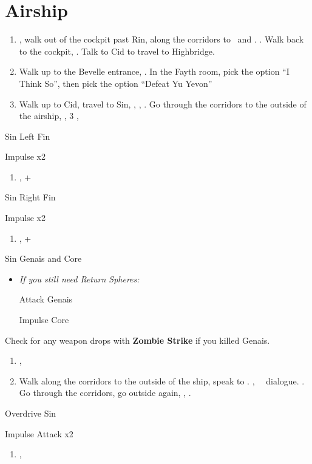 \chapter{Airship}
\begin{enumerate}
	\item \sd, walk out of the cockpit past Rin, along the corridors to \yuna\ and \kimahri. \sd. Walk back to the cockpit, \sd. Talk to Cid to travel to Highbridge.
	\item Walk up to the Bevelle entrance, \sd. In the Fayth room, pick the  option ``I Think So'', then pick the  option ``Defeat Yu Yevon''
	\item Walk up to Cid, travel to Sin, \sd, \skippablefmv, \sd. Go through the corridors to the outside of the airship, \sd, 3 \skippablefmv[2:10], \sd
\end{enumerate}
\begin{battle}[65000]{Sin Left Fin}
	\begin{itemize}
		\summon{\bahamut}
		\bahamutf Impulse x2
	\end{itemize}
\end{battle}
\begin{enumerate}[resume]
	\item \sd, \cs+\skippablefmv
\end{enumerate}
\begin{battle}[65000]{Sin Right Fin}
	\begin{itemize}
		\summon{\bahamut}
		\bahamutf Impulse x2
	\end{itemize}
\end{battle}
\begin{enumerate}[resume]
	\item \sd, \cs+\skippablefmv
\end{enumerate}
\begin{battle}[56000]{Sin Genais and Core}
	\begin{itemize}
		\summon{\bahamut}
		\item \textit{If you still need Return Spheres:}
			\begin{itemize}
				\bahamutf Attack Genais
			\end{itemize}
		\bahamutf Impulse Core
	\end{itemize}
	Check for any weapon drops with \textbf{Zombie Strike} if you killed Genais.
\end{battle}
\begin{enumerate}[resume]
	\item \sd, \skippablefmv
	\item Walk along the corridors to the outside of the ship, speak to \yuna. \cs[1:40], \sd\ \rikku\ dialogue. \skippablefmv. Go through the corridors, go outside again, \skippablefmv, \sd.
\end{enumerate}
\begin{battle}[140000]{Overdrive Sin}
	\begin{itemize}
		\summon{\bahamut}
		\bahamutf Impulse
		\bahamutf Attack x2
	\end{itemize}
\end{battle}
\begin{enumerate}[resume]
	\item \skippablefmv[1:20], \sd
\end{enumerate}